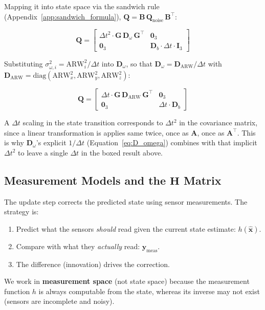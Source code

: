 \documentclass[12pt,a4paper]{article}
\newcommand{\bx}{\bm{x}}
\newcommand{\bG}{\bm{G}}
\newcommand{\bQ}{\bm{Q}}
\begin{document}
{Mapping it into state space via the sandwich rule
(Appendix~\ref{app:sandwich_formula}), $\bQ = \bm{B}\,\bQ_\text{noise}\,\bm{B}^{\top}$:

\begin{equation}
  \bQ =
  \begin{bmatrix}
    \Delta t^2 \cdot \bG\,\bm{D}_\omega\,\bG^{\top} & \bm{0}_3 \\
    \bm{0}_3 &  \bm{D}_b \cdot \Delta t \cdot \bm{I}_3
  \end{bmatrix}
  \label{eq:Q_intermediate}
\end{equation}

Substituting $\sigma_{\omega,i}^2 = \mathrm{ARW}_i^2/\Delta t$ into
$\bm{D}_\omega$, so that $\bm{D}_\omega = \bm{D}_{\mathrm{ARW}}/\Delta t$
with $\bm{D}_{\mathrm{ARW}} = \mathrm{diag}(\mathrm{ARW}_x^2, \mathrm{ARW}_y^2, \mathrm{ARW}_z^2)$:

\begin{equation}
  \boxed{
  \bQ =
  \begin{bmatrix}
    \Delta t \cdot \bG\,\bm{D}_{\mathrm{ARW}}\,\bG^{\top} & \bm{0}_3 \\
    \bm{0}_3 & \Delta t \cdot \bm{D}_b
  \end{bmatrix}
  }
  \label{eq:Q}
\end{equation}

  A $\Delta t$ scaling in the state transition corresponds to
  $\Delta t^2$ in the covariance matrix, since a linear transformation is
  applies same twice, once as $\bm{A}$, once as
  $\bm{A}^\top$. This is why $\bm{D}_\omega$'s explicit $1/\Delta t$
  (Equation~\eqref{eq:D_omega}) combines with that implicit
  $\Delta t^2$ to leave a single $\Delta t$ in the boxed result
  above.

\subsection{Measurement Models and the \texorpdfstring{$\bm{H}$}{H} Matrix}
\label{sec:H}
The update step corrects the predicted state using sensor measurements. The
strategy is:
\begin{enumerate}
  \item Predict what the sensors \emph{should} read given the current state
        estimate: $h(\hat{\bx})$.
  \item Compare with what they \emph{actually} read: $\bm{y}_{\text{meas}}$.
  \item The difference (innovation) drives the correction.
\end{enumerate}
We work in \textbf{measurement space} (not state space) because the
measurement function $h$ is always computable from the state, whereas its
inverse may not exist (sensors are incomplete and noisy). \\

}
\end{document}
